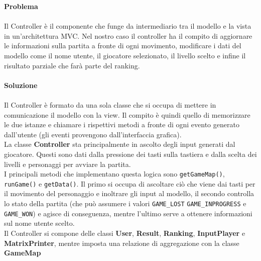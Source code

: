 \documentclass[12pt, letterpaper]{article}
\begin{document}
            \textbf{Problema}
            \\ \\
            Il Controller è il componente che funge da intermediario tra il modello e la vista in un'architettura MVC. Nel nostro caso il controller ha il compito di aggiornare le informazioni sulla partita a fronte di ogni movimento, modificare i dati del modello come il nome utente, il giocatore selezionato, il livello scelto e infine il risultato parziale che farà parte del ranking.
            \\ \\
            \textbf{Soluzione}
            \\ \\
            Il Controller è formato da una sola classe che si occupa di mettere in comunicazione il modello con la view. Il compito è quindi quello di memorizzare le due istanze e chiamare i rispettivi metodi a fronte di ogni evento generato dall'utente (gli eventi provengono dall'interfaccia grafica). \\
            La classe \textbf{Controller} sta principalmente in ascolto degli input generati dal giocatore. Questi sono dati dalla pressione dei tasti sulla tastiera e dalla scelta dei livelli e personaggi per avviare la partita.\\
            I principali metodi che implementano questa logica sono \verb|getGameMap()|, \verb|runGame()| e \verb|getData()|. Il primo si occupa di ascoltare ciò che viene dai tasti per il movimento del personaggio e inoltrare gli input al modello, il secondo controlla lo stato della partita (che può assumere i valori \verb|GAME_LOST| \verb|GAME_INPROGRESS| e \verb|GAME_WON|) e agisce di conseguenza, mentre l'ultimo serve a ottenere informazioni sul nome utente scelto.\\
            Il Controller si compone delle classi \textbf{User}, \textbf{Result}, \textbf{Ranking}, \textbf{InputPlayer} e \textbf{MatrixPrinter}, mentre imposta una relazione di aggregazione con la classe \textbf{GameMap}
    \newpage
\end{document}
